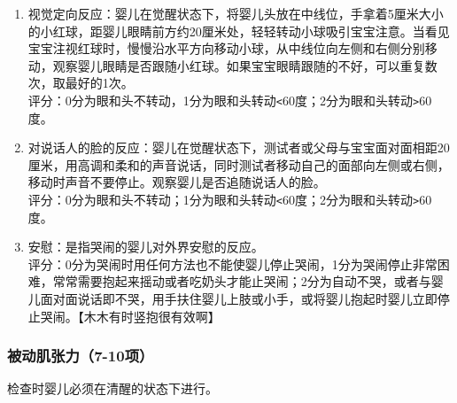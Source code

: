 \begin{enumerate}
\item
  视觉定向反应：婴儿在觉醒状态下，将婴儿头放在中线位，手拿着5厘米大小的小红球，距婴儿眼睛前方约20厘米处，轻轻转动小球吸引宝宝注意。当看见宝宝注视红球时，慢慢沿水平方向移动小球，从中线位向左侧和右侧分别移动，观察婴儿眼睛是否跟随小红球。如果宝宝眼睛跟随的不好，可以重复数次，取最好的1次。\\
  评分：0分为眼和头不转动，1分为眼和头转动\texttt{\textless{}}\hspace{0pt}60度；2分为眼和头转动\texttt{\textgreater{}}\hspace{0pt}60度。
\item
  对说话人的脸的反应：婴儿在觉醒状态下，测试者或父母与宝宝面对面相距20厘米，用高调和柔和的声音说话，同时测试者移动自己的面部向左侧或右侧，移动时声音不要停止。观察婴儿是否追随说话人的脸。\\
  评分：0分为眼和头不转动；1分为眼和头转动\texttt{\textless{}}\hspace{0pt}60度；2分为眼和头转动\texttt{\textgreater{}}\hspace{0pt}60度。
\item
  安慰：是指哭闹的婴儿对外界安慰的反应。\\
  评分：0分为哭闹时用任何方法也不能使婴儿停止哭闹，1分为哭闹停止非常困难，常常需要抱起来摇动或者吃奶头才能止哭闹；2分为自动不哭，或者与婴儿面对面说话即不哭，用手扶住婴儿上肢或小手，或将婴儿抱起时婴儿立即停止哭闹。【木木有时竖抱很有效啊】
\end{enumerate}


\subsubsection{被动肌张力（7-10项）}

检查时婴儿必须在清醒的状态下进行。

